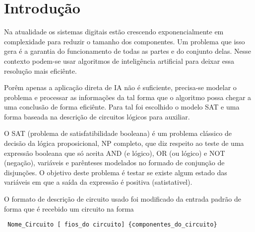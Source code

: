 \section{Introdução}
\label{sec:introducao}

Na atualidade os sistemas digitais estão crescendo exponencialmente em complexidade para reduzir o tamanho dos componentes. Um problema que isso gera é a garantia do funcionamento de todas as partes e do conjunto delas. Nesse contexto podem-se usar algoritmos de inteligência artificial para deixar essa resolução mais eficiênte.

Porêm apenas a aplicação direta de IA não é suficiente, precisa-se modelar o problema e processar as informações da tal forma que o algoritmo possa chegar a uma conclusão de forma eficiênte. Para tal foi escolhido o modelo SAT e uma forma baseada na descrição de circuitos lógicos para auxiliar. 

O SAT (problema de satisfatibilidade booleana) é um problema clássico de decisão da lógica proposicional, NP completo, que diz respeito ao teste de uma expressão booleana que só aceita AND (e lógico), OR (ou lógico) e NOT (negação), variáveis e parênteses modelados no formado de conjunção de disjunções. O objetivo deste problema é testar se existe algum estado das variáveis em que a saída da expressão é positiva (satistativel).

O formato de descrição de circuito usado foi modificado da entrada padrão de forma que é recebido um circuito na forma
\begin{lstlisting}
 Nome_Circuito [ fios_do circuito] {componentes_do_circuito}
\end{lstlisting}